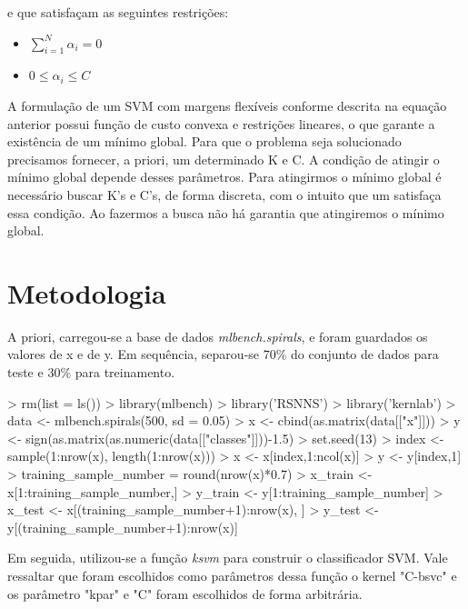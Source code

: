 \documentclass[12pt]{article}
\begin{document}
  \begin{center}
   e que satisfaçam as seguintes restrições:
    \begin{itemize}
    \item $\sum_{i=1}^{N}\alpha_i= 0$
    \item $0\leq \alpha_i  \leq C$
    \end{itemize}
  \end{center} 

  \par A formulação de um SVM com margens flexíveis conforme descrita na equação anterior possui função de custo convexa e restrições lineares, o que garante a existência de um mínimo global. Para que o problema seja solucionado precisamos fornecer, a priori, um determinado K e C. A condição de atingir o mínimo global depende desses parâmetros. Para atingirmos o mínimo global é necessário buscar K's e C's, de forma discreta, com o intuito que um satisfaça essa condição. Ao fazermos a busca não há garantia que atingiremos o mínimo global. 


\section{Metodologia}
  \par A priori, carregou-se a base de dados \textit{mlbench.spirals}, e foram guardados os valores de x e de y. Em sequência, separou-se 70\% do conjunto de dados para teste e 30\% para treinamento.

\begin{Schunk}
\begin{Sinput}
> rm(list = ls())
> library(mlbench)
> library('RSNNS')
> library('kernlab')
> data <- mlbench.spirals(500, sd = 0.05)
> x <- cbind(as.matrix(data[["x"]]))
> y <- sign(as.matrix(as.numeric(data[["classes"]]))-1.5)
> set.seed(13)
> index <- sample(1:nrow(x), length(1:nrow(x)))
> x <- x[index,1:ncol(x)]
> y <- y[index,1]
> training_sample_number = round(nrow(x)*0.7)
> x_train <- x[1:training_sample_number,]
> y_train <- y[1:training_sample_number]
> x_test <- x[(training_sample_number+1):nrow(x), ]
> y_test <- y[(training_sample_number+1):nrow(x)]
\end{Sinput}
\end{Schunk}

  \par Em seguida, utilizou-se a função \textit{ksvm} para construir o classificador SVM. Vale ressaltar que foram escolhidos como parâmetros dessa função o kernel "C-bsvc" e os parâmetro "kpar" e "C" foram escolhidos de forma arbitrária.
\end{document}

